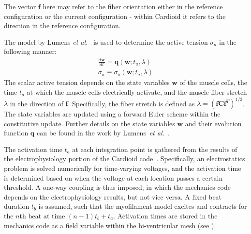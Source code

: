 The vector $\bm{f}$ here may refer to the fiber orientation either in the reference configuration or the current configuration - within Cardioid it refers to the direction in the reference configuration.

The model by Lumens \textit{et al.}~\cite{lumens_2009} is used to determine the active tension $\sigma_a$ in the following manner:
\begin{align}
\frac{d\bm{w}}{dt} = \bm{q}(\bm{w}; t_a, \lambda) \\
\sigma_a \equiv \sigma_a(\bm{w}; t_a, \lambda)
\end{align}
The scalar active tension depends on the state variables $\bm{w}$ of the muscle cells, the time $t_a$ at which the muscle cells electrically activate, and the muscle fiber stretch $\lambda$ in the direction of $\bm{f}$. Specifically, the fiber stretch is defined as $\lambda = (\bm{f}\bm{C}\bm{f}^T)^{1/2}$. The state variables are updated using a forward Euler scheme within the constitutive update. Further details on the state variables $\bm{w}$ and their evolution function $\bm{q}$ can be found in the work by Lumens~\textit{et al.}~\cite{lumens_2009}.

The activation time $t_a$ at each integration point is gathered from the results of the electrophysiology portion of the Cardioid code~\cite{richards_2013}. Specifically, an electrostatics problem is solved numerically for time-varying voltages, and the activation time is determined based on when the voltage at each location passes a certain threshold. A one-way coupling is thus imposed, in which the mechanics code depends on the electrophysiology results, but not vice versa. A fixed beat duration $t_b$ is assumed, such that the myofilament model excites and contracts for the $n$th beat at time $(n-1)t_b + t_a$. Activation times are stored in the mechanics code as a field variable within the bi-ventricular mesh (see ).

